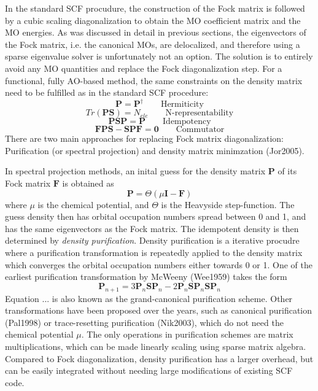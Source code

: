 In the standard SCF procudure, the construction of the Fock matrix is followed by a cubic scaling diagonalization to obtain the MO coefficient matrix and the MO energies. As was discussed in detail in previous sections, the eigenvectors of the Fock matrix, i.e. the canonical MOs, are delocalized, and therefore using a sparse eigenvalue solver is unfortunately not an option. The solution is to entirely avoid any MO quantities and replace the Fock diagonalization step. For a functional, fully AO-based method, the same constraints on the density matrix need to be fulfilled as in the standard SCF procedure:
\begin{equation}
\mathbf{P} = \mathbf{P}^{\dagger} \qquad \textrm{Hermiticity}
\end{equation}
\begin{equation}
Tr(\mathbf{PS}) = N_{ele} \qquad \textrm{N-representability}
\end{equation}
\begin{equation}
\mathbf{PSP} = \mathbf{P} \qquad \textrm{Idempotency}
\end{equation}
\begin{equation}
\mathbf{FPS} - \mathbf{SPF} = \mathbf{0} \qquad \textrm{Commutator}
\end{equation}
\noindent There are two main approaches for replacing Fock matrix diagonalization: Purification (or spectral projection) and density matrix minimzation (Jor2005).

In spectral projection methods, an inital guess for the density matrix $\mathbf{P}$ of its Fock matrix $\mathbf{F}$ is obtained as
\begin{equation}
\mathbf{P} = \Theta \left( \mu \mathbf{I} - \mathbf{F} \right)
\end{equation}
\noindent where $\mu$ is the chemical potential, and $\Theta$ is the Heavyside step-function. The guess density then has orbital occupation numbers spread between 0 and 1, and has the same eigenvectors as the Fock matrix. The idempotent density is then determined by \emph{density purification}. Density purification is a iterative procudre where a purification transformation is repeatedly applied to the density matrix which converges the orbital occupation numbers either towards 0 or 1. One of the earliest purification transformation by McWeeny (Wee1959) takes the form
\begin{equation}
\mathbf{P}_{n+1} = 3\mathbf{P}_n\mathbf{SP}_n - 2\mathbf{P}_n\mathbf{SP}_n\mathbf{SP}_n
\end{equation}
\noindent Equation ... is also known as the grand-canonical purification scheme. Other transformations have been proposed over the years, such as canonical purification (Pal1998) or trace-resetting purification (Nik2003), which do not need the chemical potential $\mu$. The only operations in purification schemes are matrix multiplications, which can be made linearly scaling using sparse matrix algebra. Compared to Fock diagonalization, density purification has a larger overhead, but can be easily integrated without needing large modifications of existing SCF code.

